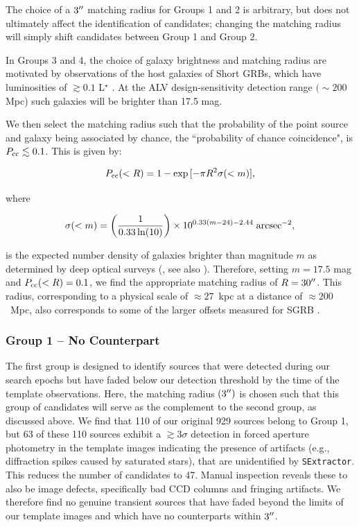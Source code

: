 The choice of a $3\hbox{$^{\prime\prime}$}$ matching radius for Groups 1 and 2 is arbitrary, but does not ultimately affect the identification of candidates; changing the matching radius will simply shift candidates between Group 1 and Group 2.

In Groups 3 and 4, the choice of galaxy brightness and matching radius are motivated by observations of the host galaxies of Short GRBs, which have luminosities of $\gtrsim 0.1$ L$^\star$ \citep{FongBerger13,Fong+13,Berger2014}. At the ALV design-sensitivity detection range $(\sim 200$ Mpc) such galaxies will be brighter than 17.5 mag.

\clearpage
We then select the matching radius such that the probability of the point source and galaxy being associated by chance, the ``probability of chance coincidence", is $P_{\rm cc}\lesssim 0.1$. This is given by:

\begin{equation}
P_{\rm cc}(<R) = 1 - \exp{[-\pi R^2 \sigma(<m)]},
\end{equation}

\noindent where

\begin{equation}
\sigma(<m) = \left ( \frac{1}{0.33 \ln(10)} \right ) \times 10^{0.33(m - 24) - 2.44} \; {\rm arcsec}^{-2},
\end{equation}

\noindent is the expected number density of galaxies brighter than magnitude $m$ as determined by deep optical surveys (\citealt{Berger2010}, see also \citealt{Hogg+97,Bloom+02,Beckwith+06}). Therefore, setting $m = 17.5$ mag and $P_{\rm cc}(<R) = 0.1$, we find the appropriate matching radius of $R = 30\hbox{$^{\prime\prime}$}$. This radius, corresponding to a physical scale of $\approx 27$~kpc at a distance of $\approx200$~Mpc, also corresponds to some of the larger offsets measured for SGRB \citep{Fong+10,FongBerger13,Berger2014}.

\subsubsection{Group 1 -- No Counterpart}
\label{sec:ch3_group1}

The first group is designed to identify sources that were detected during our search epochs but have faded below our detection threshold by the time of the template observations. Here, the matching radius $(3 \hbox{$^{\prime\prime}$})$ is chosen such that this group of candidates will serve as the complement to the second group, as discussed above. We find that 110 of our original 929 sources belong to Group 1, but 63 of these 110 sources exhibit a $\gtrsim 3 \sigma$ detection in forced aperture photometry in the template images indicating the presence of artifacts (e.g., diffraction spikes caused by saturated stars), that are unidentified by {\tt SExtractor}. This reduces the number of candidates to 47. Manual inspection reveals these to also be image defects, specifically bad CCD columns and fringing artifacts. We therefore find no genuine transient sources that have faded beyond the limits of our template images and which have no counterparts within $3\hbox{$^{\prime\prime}$}$.

